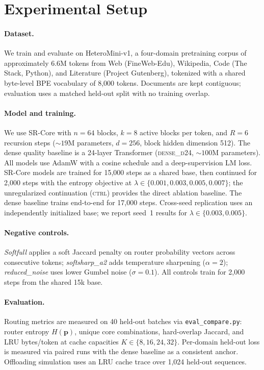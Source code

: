 \section{Experimental Setup}
\label{sec:setup}

\paragraph{Dataset.}
We train and evaluate on HeteroMini-v1, a four-domain pretraining corpus of approximately
6.6M tokens from Web (FineWeb-Edu), Wikipedia, Code (The Stack, Python), and Literature
(Project Gutenberg), tokenized with a shared byte-level BPE vocabulary of 8,000 tokens.
Documents are kept contiguous; evaluation uses a matched held-out split with no training
overlap.

\paragraph{Model and training.}
We use SR-Core with $n = 64$ blocks, $k = 8$ active blocks per token, and $R = 6$
recursion steps (${\sim}19$M parameters, $d = 256$, block hidden dimension 512).
The dense quality baseline is a 24-layer Transformer (\textsc{dense\_d24},
${\sim}100$M parameters).
All models use AdamW with a cosine schedule and a deep-supervision LM loss.
SR-Core models are trained for 15,000 steps as a shared base, then continued for 2,000
steps with the entropy objective at $\lambda \in \{0.001, 0.003, 0.005, 0.007\}$; the
unregularized continuation (\textsc{ctrl}) provides the direct ablation baseline.
The dense baseline trains end-to-end for 17,000 steps.
Cross-seed replication uses an independently initialized base; we report seed~1 results
for $\lambda \in \{0.003, 0.005\}$.

\paragraph{Negative controls.}
\emph{Softfull} applies a soft Jaccard penalty on router probability vectors across
consecutive tokens; \emph{softsharp\_a2} adds temperature sharpening ($\alpha = 2$);
\emph{reduced\_noise} uses lower Gumbel noise ($\sigma = 0.1$).
All controls train for 2,000 steps from the shared 15k base.

\paragraph{Evaluation.}
Routing metrics are measured on 40 held-out batches via \texttt{eval\_compare.py}:
router entropy $H(\mathbf{p})$, unique core combinations, hard-overlap Jaccard, and LRU
bytes/token at cache capacities $K \in \{8,16,24,32\}$.
Per-domain held-out loss is measured via paired runs with the dense baseline as a
consistent anchor.
Offloading simulation uses an LRU cache trace over 1,024 held-out sequences.
